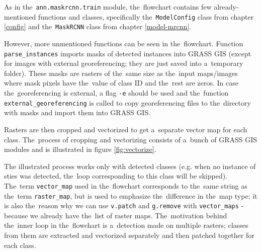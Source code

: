 As in the~\verb|ann.maskrcnn.train| module, the~flowchart contains few 
already-mentioned functions and classes, specifically the~\verb|ModelConfig| 
class from chapter \ref{config} and the~\verb|MaskRCNN| class from chapter 
\ref{model-mrcnn}.

However, more unmentioned functions can be seen in the~flowchart. Function
\verb|parse_instances| imports masks of detected instances into GRASS GIS
(except for images with external georeferencing; they are just saved into
a~temporary folder). These masks are rasters of the~same size as the~input
maps/images where mask pixels have the~value of class ID and the~rest are
zeros. In case the~georeferencing is external, a flag \verb|-e| should be
used and the~function \verb|external_georeferencing| is 
called to copy georeferencing files to the~directory with masks and import them
into GRASS GIS.

Rasters are then cropped and vectorized to get a~separate vector map for each
class. The~process of cropping and vectorizing consists of a~bunch of GRASS GIS
modules and is illustrated in figure \ref{fig:vectorize}.

The illustrated process works only with detected classes (e.g. when no instance 
of sties was detected, the~loop corresponding to this class will be skipped). 
The~term \verb|vector_map| used in the~flowchart corresponds to the~same string 
as the~term \verb|raster_map|, but is used to emphasize the~difference in
the~map type; it is also the~reason why we can use \verb|v.patch| and 
\verb|g.remove| with \verb|vector_maps| - because we already have the~list of 
raster maps. The~motivation behind the~inner loop in the~flowchart is
a~detection made on multiple rasters; classes from them are extracted and 
vectorized separately and then patched together for each class.

